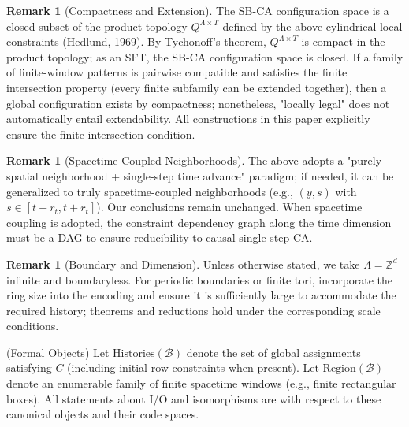 \documentclass[12pt]{article}
\theoremstyle{plain}
\theoremstyle{definition}
\newtheorem{remark}[theorem]{Remark}
\begin{document}
\begin{remark}[Compactness and Extension]
The SB-CA configuration space is a closed subset of the product topology $Q^{\Lambda\times T}$ defined by the above cylindrical local constraints (Hedlund, 1969)\cite{hedlund1969}. By Tychonoff's theorem, $Q^{\Lambda\times T}$ is compact in the product topology; as an SFT, the SB-CA configuration space is closed. If a family of finite-window patterns is pairwise compatible and satisfies the finite intersection property (every finite subfamily can be extended together), then a global configuration exists by compactness; nonetheless, "locally legal" does not automatically entail extendability. All constructions in this paper explicitly ensure the finite-intersection condition.
\end{remark}

\begin{remark}[Spacetime-Coupled Neighborhoods]
The above adopts a "purely spatial neighborhood + single-step time advance" paradigm; if needed, it can be generalized to truly spacetime-coupled neighborhoods (e.g., $(y,s)$ with $s\in[t-r_t, t+r_t]$). Our conclusions remain unchanged. When spacetime coupling is adopted, the constraint dependency graph along the time dimension must be a DAG to ensure reducibility to causal single-step CA.
\end{remark}

\begin{remark}[Boundary and Dimension]
Unless otherwise stated, we take $\Lambda=\mathbb{Z}^d$ infinite and boundaryless. For periodic boundaries or finite tori, incorporate the ring size into the encoding and ensure it is sufficiently large to accommodate the required history; theorems and reductions hold under the corresponding scale conditions.
\end{remark}

(Formal Objects) Let $\mathrm{Histories}(\mathcal{B})$ denote the set of global assignments satisfying $C$ (including initial-row constraints when present). Let $\mathrm{Region}(\mathcal{B})$ denote an enumerable family of finite spacetime windows (e.g., finite rectangular boxes). All statements about I/O and isomorphisms are with respect to these canonical objects and their code spaces.
\end{document}
